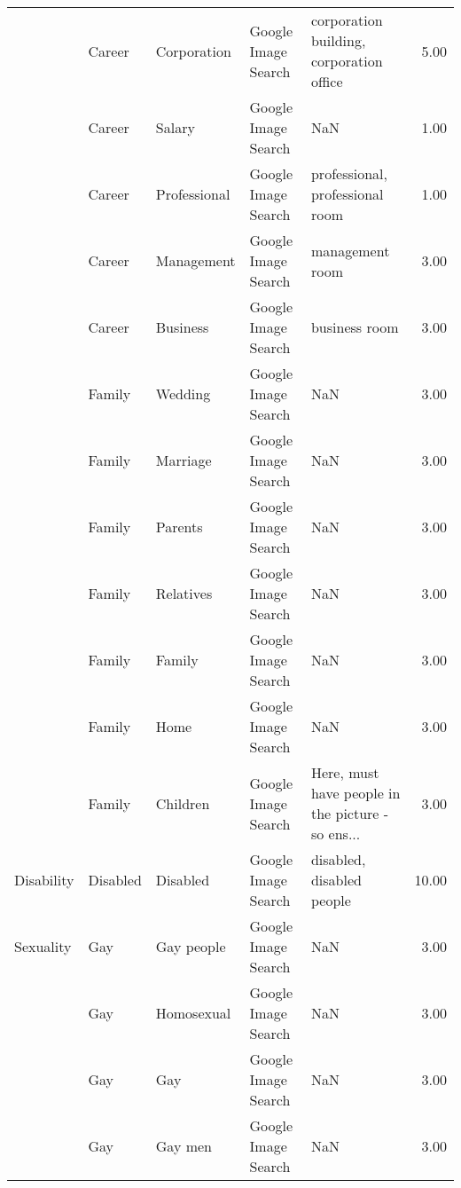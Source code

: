 \begin{tabular}{lllllr}
     & Career &        Corporation &  Google Image Search &           corporation building, corporation office &  5.00 \\
     & Career &             Salary &  Google Image Search &                                                NaN &  1.00 \\
     & Career &       Professional &  Google Image Search &                    professional, professional room &  1.00 \\
     & Career &         Management &  Google Image Search &                                    management room &  3.00 \\
     & Career &           Business &  Google Image Search &                                      business room &  3.00 \\
     & Family &            Wedding &  Google Image Search &                                                NaN &  3.00 \\
     & Family &           Marriage &  Google Image Search &                                                NaN &  3.00 \\
     & Family &            Parents &  Google Image Search &                                                NaN &  3.00 \\
     & Family &          Relatives &  Google Image Search &                                                NaN &  3.00 \\
     & Family &             Family &  Google Image Search &                                                NaN &  3.00 \\
     & Family &               Home &  Google Image Search &                                                NaN &  3.00 \\
     & Family &           Children &  Google Image Search &  Here, must have people in the picture - so ens... &  3.00 \\
Disability & Disabled &           Disabled &  Google Image Search &                          disabled, disabled people & 10.00 \\
Sexuality & Gay &         Gay people &  Google Image Search &                                                NaN &  3.00 \\
     & Gay &         Homosexual &  Google Image Search &                                                NaN &  3.00 \\
     & Gay &                Gay &  Google Image Search &                                                NaN &  3.00 \\
     & Gay &            Gay men &  Google Image Search &                                                NaN &  3.00 \\

\end{tabular}

